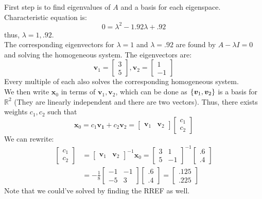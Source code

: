 \documentclass[11pt]{scrartcl}
\theoremstyle{dotlessP}
\theoremstyle{dotlessN}
\DeclarePairedDelimiter\set{\{}{\}}
\newcommand{\reals}{\mathbb{R}} %
\begin{document}
\begin{soln}
	First step is to find eigenvalues of $A$ and a basis for each eigenspace. Characteristic equation is:
	\[
		0 = \lambda^2 - 1.92\lambda + .92
	\] 
	thus, $\lambda = 1, .92$.
\\

	The corresponding eigenvectors for  $\lambda = 1$ and $\lambda = .92$ are found by $A - \lambda I = 0$ and solving the homogeneous system. The eigenvectors are:
	\[
		\bm{v}_1 =	\begin{bmatrix}
		3 \\
		5
	\end{bmatrix},
	\bm{v}_2 =	\begin{bmatrix}
		1 \\
		-1
	\end{bmatrix}
	\] 
	Every multiple of each also solves the corresponding homogeneous system.
\\

	We then write $\bm{x}_0$ in terms of $\bm{v}_1, \bm{v}_2$, which can be done as $\set*{\bm{v}_1, \bm{v}_2}$ is a basis for $\reals^2$ (They are linearly independent and there are two vectors). Thus, there exists weights $c_1, c_2$ such that
	\[
		\bm{x}_0 = c_1\bm{v_1} + c_2\bm{v}_2 = 
		\begin{bmatrix}
			\bm{v}_1 & \bm{v}_2
		\end{bmatrix}
		\begin{bmatrix}
		c_1 \\
		c_2
		\end{bmatrix}
	\] 
	We can rewrite:
	\begin{align*}
		\begin{bmatrix}
			c_1 \\
			c_2
		\end{bmatrix} &= 
		\begin{bmatrix}
			\bm{v}_1 & \bm{v}_2
		\end{bmatrix}^{-1} \bm{x}_0 =
		\begin{bmatrix}
			3 & 1 \\
			5 & -1
		\end{bmatrix}^{-1}
		\begin{bmatrix}
			.6 \\
			.4
		\end{bmatrix} \\
		&= -\frac{1}{8}
		\begin{bmatrix}
			-1 & -1 \\
			-5 & 3
		\end{bmatrix}
		\begin{bmatrix}
			.6 \\
			.4
		\end{bmatrix} =
		\begin{bmatrix}
			.125 \\
			.225
		\end{bmatrix}
	\end{align*}
	Note that we could've solved by finding the RREF as well. 
	\\


\end{soln}
\end{document}
